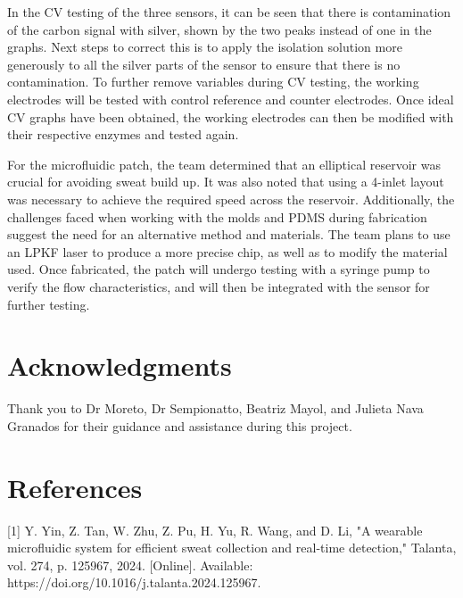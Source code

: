 \documentclass[conference]{IEEEtran}
\begin{document}
In the CV testing of the three sensors, it can be seen that there is contamination of the carbon signal with silver, shown by the two peaks instead of one in the graphs. Next steps to correct this is to apply the isolation solution more generously to all the silver parts of the sensor to ensure that there is no contamination. To further remove variables during CV testing, the working electrodes will be tested with control reference and counter electrodes. Once ideal CV graphs have been obtained, the working electrodes can then be modified with their respective enzymes and tested again. 

For the microfluidic patch, the team determined that an elliptical reservoir was crucial for avoiding sweat build up. It was also noted that using a 4-inlet layout was necessary to achieve the required speed across the reservoir. Additionally, the challenges faced when working with the molds and PDMS during fabrication suggest the need for an alternative method and materials. The team plans to use an LPKF laser to produce a more precise chip, as well as to modify the material used. Once fabricated, the patch will undergo testing with a syringe pump to verify the flow characteristics, and will then be integrated with the sensor for further testing.
\bigskip

\section{Acknowledgments} 

Thank you to Dr Moreto, Dr Sempionatto, Beatriz Mayol, and Julieta Nava Granados for their guidance and assistance during this project.

\bigskip

\section{References}
[1] Y. Yin, Z. Tan, W. Zhu, Z. Pu, H. Yu, R. Wang, and D. Li, "A wearable microfluidic system for efficient sweat collection and real-time detection," Talanta, vol. 274, p. 125967, 2024. [Online]. Available: https://doi.org/10.1016/j.talanta.2024.125967.
\end{document}
